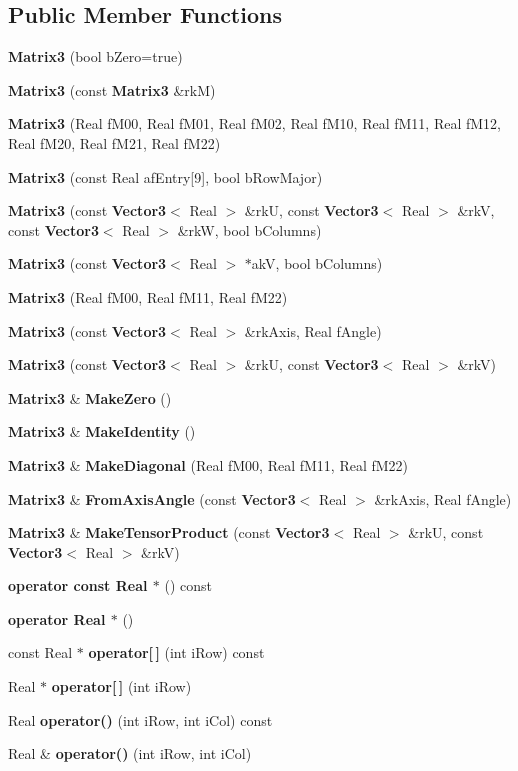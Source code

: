\subsection*{Public Member Functions}
\begin{CompactItemize}
\item 
{\bf Matrix3} (bool b\-Zero=true)
\item 
{\bf Matrix3} (const {\bf Matrix3} \&rk\-M)
\item 
{\bf Matrix3} (Real f\-M00, Real f\-M01, Real f\-M02, Real f\-M10, Real f\-M11, Real f\-M12, Real f\-M20, Real f\-M21, Real f\-M22)
\item 
{\bf Matrix3} (const Real af\-Entry[9], bool b\-Row\-Major)
\item 
{\bf Matrix3} (const {\bf Vector3}$<$ Real $>$ \&rk\-U, const {\bf Vector3}$<$ Real $>$ \&rk\-V, const {\bf Vector3}$<$ Real $>$ \&rk\-W, bool b\-Columns)
\item 
{\bf Matrix3} (const {\bf Vector3}$<$ Real $>$ $\ast$ak\-V, bool b\-Columns)
\item 
{\bf Matrix3} (Real f\-M00, Real f\-M11, Real f\-M22)
\item 
{\bf Matrix3} (const {\bf Vector3}$<$ Real $>$ \&rk\-Axis, Real f\-Angle)
\item 
{\bf Matrix3} (const {\bf Vector3}$<$ Real $>$ \&rk\-U, const {\bf Vector3}$<$ Real $>$ \&rk\-V)
\item 
{\bf Matrix3} \& {\bf Make\-Zero} ()
\item 
{\bf Matrix3} \& {\bf Make\-Identity} ()
\item 
{\bf Matrix3} \& {\bf Make\-Diagonal} (Real f\-M00, Real f\-M11, Real f\-M22)
\item 
{\bf Matrix3} \& {\bf From\-Axis\-Angle} (const {\bf Vector3}$<$ Real $>$ \&rk\-Axis, Real f\-Angle)
\item 
{\bf Matrix3} \& {\bf Make\-Tensor\-Product} (const {\bf Vector3}$<$ Real $>$ \&rk\-U, const {\bf Vector3}$<$ Real $>$ \&rk\-V)
\item 
{\bf operator const Real $\ast$} () const
\item 
{\bf operator Real $\ast$} ()
\item 
const Real $\ast$ {\bf operator[$\,$]} (int i\-Row) const
\item 
Real $\ast$ {\bf operator[$\,$]} (int i\-Row)
\item 
Real {\bf operator()} (int i\-Row, int i\-Col) const
\item 
Real \& {\bf operator()} (int i\-Row, int i\-Col)
\item 

\end{CompactItemize}
